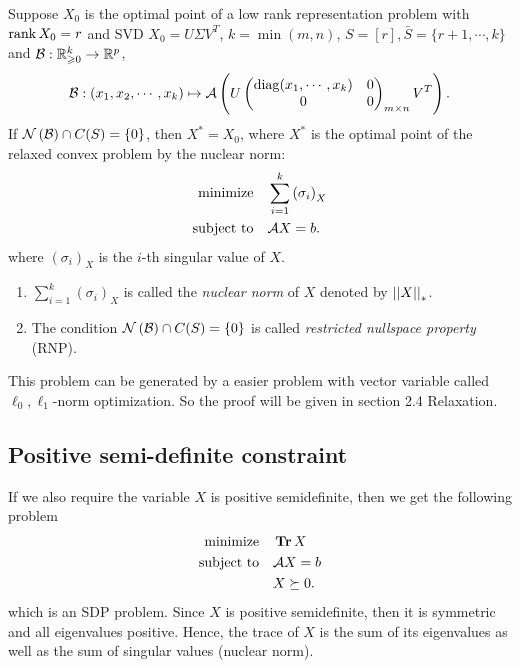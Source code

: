 \documentclass[11pt]{article}
\begin{document}
\begin{theorem}
    Suppose \(X_0\) is the optimal point of a low rank representation problem with $\operatorname{rank} X_0=r$ and SVD \(X_0 = U\Sigma V^T\), $k=\min(m,n)$, $S=[r],\bar{S}=\{r+1,\cdots ,k\}$ and \(\mathcal{B}:\mathbb R^k_{\geqslant 0} \to \mathbb R^p\),
    \[\mathcal{B}:(x_1,x_2,\cdots,x_k) \mapsto \mathcal{A}\left( U \begin{pmatrix}
        \operatorname{diag}(x_1,\cdots,x_k) & 0 \\
        0 & 0
    \end{pmatrix}_{m\times n} V^T\right).\]
    If \(\mathcal N\left(\mathcal{B}\right)\cap C(S) = \{0\}\), then \(X^\ast=X_0\), where \(X^\ast\) is the optimal point of the relaxed convex problem by the nuclear norm: 
    \[\begin{aligned}
        \textnormal{minimize}\quad & \sum_{i=1}^k\left(\sigma_i\right)_X\\
        \textnormal{subject to}\quad & \mathcal AX=b.
    \end{aligned}\]
    where \((\sigma_i)_X\) is the \(i\)-th singular value of \(X\).
\end{theorem}

\begin{remark}
    \begin{enumerate}[(1)]
        \item \(\sum_{i=1}^{k} (\sigma_i)_X\) is called the \emph{nuclear norm} of \(X\) denoted by \(\left|\left|X\right|\right|_\ast\).
        \item The condition \(\mathcal N\left(\mathcal{B}\right)\cap C(S) = \{0\}\) is called \emph{restricted nullspace property} (RNP).
    \end{enumerate}
\end{remark}

This problem can be generated by a easier problem with vector variable called \(\ell_0,\ell_1\)-norm optimization. So the proof will be given in section 2.4 Relaxation.

\subsection{Positive semi-definite constraint}

If we also require the variable \(X\) is positive semidefinite, then we get the following problem 
\[\begin{aligned}
    \textnormal{minimize}\quad & \operatorname{\mathbf{Tr}} X\\
    \textnormal{subject to}\quad & \mathcal AX=b\\
    & X\succeq 0.
\end{aligned}\]
which is an SDP problem. Since \(X\) is positive semidefinite, then it is symmetric and all eigenvalues positive. Hence, the trace of \(X\) is the sum of its eigenvalues as well as the sum of singular values (nuclear norm).
\end{document}
